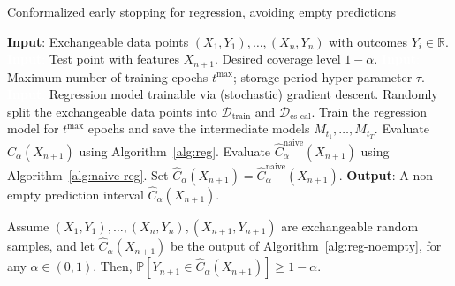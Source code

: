 \begin{algorithm}[H]
    \caption{Conformalized early stopping for regression, avoiding empty predictions}
    \label{alg:reg-noempty}
    \begin{algorithmic}[1]
        \STATE \textbf{Input}: Exchangeable data points $(X_{1},Y_{1}), \ldots, (X_{n},Y_{n})$ with outcomes $Y_i \in \mathbb{R}$.
        \STATE \textcolor{white}{\textbf{Input}:} Test point with features $X_{n+1}$. Desired coverage level $1-\alpha$.
        \STATE \textcolor{white}{\textbf{Input}:} Maximum number of training epochs $t^{\text{max}}$; storage period hyper-parameter $\tau$.
        \STATE \textcolor{white}{\textbf{Input}:} Regression model trainable via (stochastic) gradient descent.
        \STATE Randomly split the exchangeable data points into $\mathcal{D}_{\text{train}}$ and $\mathcal{D}_{\text{es-cal}}$.
        \STATE Train the regression model for $t^{\text{max}}$ epochs and save the intermediate models $M_{t_1} , \dots, M_{t_T}$.
        \STATE Evaluate $\hat{C}_{\alpha}(X_{n+1})$ using Algorithm~\ref{alg:reg}.
        \STATE Evaluate $\hat{C}^{\text{naive}}_{\alpha}(X_{n+1})$ using Algorithm~\ref{alg:naive-reg}. Set $\hat{C}_{\alpha}(X_{n+1}) = \hat{C}^{\text{naive}}_{\alpha}(X_{n+1})$.
        \ENDIF
        \STATE \textbf{Output}: A non-empty prediction interval $\hat{C}_{\alpha}(X_{n+1})$.
    \end{algorithmic}
\end{algorithm}

\begin{corollary}\label{thm:reg-noempty}
Assume $(X_{1},Y_{1}), \ldots, (X_{n},Y_{n}), (X_{n+1},Y_{n+1})$ are exchangeable random samples, and let $\hat{C}_{\alpha}(X_{n+1})$ be the output of Algorithm~\ref{alg:reg-noempty}, for any $\alpha \in (0,1)$. 
Then, $\mathbb{P}[Y_{n+1} \in \hat{C}_{\alpha}(X_{n+1})] \geq 1-\alpha$.
\end{corollary}




